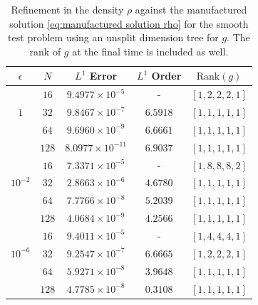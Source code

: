 \documentclass[onefignum,onetabnum]{siamart220329}
\begin{document}
\begin{table}[!ht]
    \footnotesize
    \caption{Refinement in the density $\rho$ against the manufactured solution \eqref{eq:manufactured solution rho} for the smooth test problem using an unsplit dimension tree for $g$. The rank of $g$ at the final time is included as well.}
    \label{tab:manufactured test IMEX-3 unsplit}
    \begin{center}
    \begin{tabular}{| c || c || c || c || c |}
        \hline
        $\epsilon$ & $N$ & $L^{1}$ Error & $L^{1}$ Order & $\text{Rank}(g)$ \\
        \hline
                           & $16$  & $9.4977 \times 10^{-5}$  & -        & $[1,2,2,2,1]$ \\
         $1$               & $32$  & $9.8467 \times 10^{-7}$  & $6.5918$ & $[1,1,1,1,1]$ \\
                           & $64$  & $9.6960 \times 10^{-9}$  & $6.6661$ & $[1,1,1,1,1]$ \\
                           & $128$ & $8.0977 \times 10^{-11}$ & $6.9037$ & $[1,1,1,1,1]$ \\
        \hline
                           & $16$  & $7.3371 \times 10^{-5}$ & -        & $[1,8,8,8,2]$ \\
         $10^{-2}$         & $32$  & $2.8663 \times 10^{-6}$ & $4.6780$ & $[1,1,1,1,1]$ \\
                           & $64$  & $7.7766 \times 10^{-8}$ & $5.2039$ & $[1,1,1,1,1]$ \\
                           & $128$ & $4.0684 \times 10^{-9}$ & $4.2566$ & $[1,1,1,1,1]$ \\
        \hline
                           & $16$  & $9.4011 \times 10^{-5}$ & -        & $[1,4,4,4,1]$ \\
         $10^{-6}$         & $32$  & $9.2547 \times 10^{-7}$ & $6.6665$ & $[1,2,2,2,1]$ \\
                           & $64$  & $5.9271 \times 10^{-8}$ & $3.9648$ & $[1,1,1,1,1]$ \\
                           & $128$ & $4.7785 \times 10^{-8}$ & $0.3108$ & $[1,1,1,1,1]$ \\
        \hline
    \end{tabular}
    \end{center}
\end{table}
\end{document}
